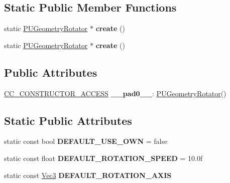 \subsection*{Static Public Member Functions}
\begin{DoxyCompactItemize}
\item 
\mbox{\label{classPUGeometryRotator_a5dcc88e5eb730cca36ac1f5392885bb0}} 
static \hyperlink{classPUGeometryRotator}{P\+U\+Geometry\+Rotator} $\ast$ {\bfseries create} ()
\item 
\mbox{\label{classPUGeometryRotator_a965775c3f21426d74aade5e9e14694d1}} 
static \hyperlink{classPUGeometryRotator}{P\+U\+Geometry\+Rotator} $\ast$ {\bfseries create} ()
\end{DoxyCompactItemize}
\subsection*{Public Attributes}
\begin{DoxyCompactItemize}
\item 
\mbox{\label{classPUGeometryRotator_a2b709672dbcbd22d31238da0879f0215}} 
\hyperlink{_2cocos2d_2cocos_2base_2ccConfig_8h_a25ef1314f97c35a2ed3d029b0ead6da0}{C\+C\+\_\+\+C\+O\+N\+S\+T\+R\+U\+C\+T\+O\+R\+\_\+\+A\+C\+C\+E\+SS} {\bfseries \+\_\+\+\_\+pad0\+\_\+\+\_\+}\+: \hyperlink{classPUGeometryRotator}{P\+U\+Geometry\+Rotator}()
\end{DoxyCompactItemize}
\subsection*{Static Public Attributes}
\begin{DoxyCompactItemize}
\item 
\mbox{\label{classPUGeometryRotator_a4eba21a5f5c2951e81be1a1ca143e389}} 
static const bool {\bfseries D\+E\+F\+A\+U\+L\+T\+\_\+\+U\+S\+E\+\_\+\+O\+WN} = false
\item 
\mbox{\label{classPUGeometryRotator_a2e1a9487daabd1cc9cd38a44a135dc21}} 
static const float {\bfseries D\+E\+F\+A\+U\+L\+T\+\_\+\+R\+O\+T\+A\+T\+I\+O\+N\+\_\+\+S\+P\+E\+ED} = 10.\+0f
\item 
\mbox{\label{classPUGeometryRotator_a61dd5ad974eab197bd25a1406e80a422}} 
static const \hyperlink{classVec3}{Vec3} {\bfseries D\+E\+F\+A\+U\+L\+T\+\_\+\+R\+O\+T\+A\+T\+I\+O\+N\+\_\+\+A\+X\+IS}
\end{DoxyCompactItemize}
